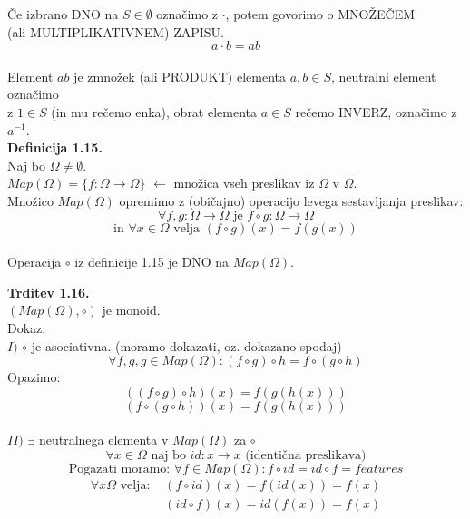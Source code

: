 \documentclass[12pt]{article}
\begin{document}
\noindent
Če izbrano DNO na $S \in \emptyset$ označimo z $\cdot$, potem govorimo o MNOŽEČEM \\
(ali MULTIPLIKATIVNEM) ZAPISU.
$$a \cdot b = ab$$ \\[1em]

\noindent
Element $ab$ je zmnožek (ali PRODUKT) elementa $a, b \in S$, neutralni element označimo \\
z $1 \in S$ (in mu rečemo enka), obrat elementa $a \in S$ rečemo INVERZ, označimo z $a^{-1}$. \\



\noindent
\textbf{Definicija 1.15.} \\
Naj bo $\Omega \ne \emptyset$. \\
$Map(\Omega) = \{ f : \Omega \to \Omega \}$ $\leftarrow$ množica vseh preslikav iz $\Omega$ v $\Omega$. \\
Množico $Map(\Omega)$ opremimo z (običajno) operacijo levega sestavljanja preslikav:
$$
\forall f, g : \Omega \to \Omega \text{ je } f \circ g : \Omega \to \Omega
$$ 
$$
\text{in } \forall x \in \Omega \text{ velja } (f\circ g)(x) = f(g(x))
$$\\[2em]

\noindent
Operacija $\circ$ iz definicije 1.15 je DNO na $Map(\Omega)$.



\vspace*{24pt}


\noindent
\textbf{Trditev 1.16.} \\
$(Map(\Omega), \circ)$ je monoid. \\[1em]
Dokaz: \\[1em]
$I)$ $\circ$ je asociativna. (moramo dokazati, oz. dokazano spodaj)
$$
\forall f, g, g \in Map(\Omega) : (f \circ g) \circ h = f \circ (g \circ h)
$$
Opazimo:
$$
((f \circ g) \circ h)(x) = f(g(h(x)))
$$
$$
(f\circ (g \circ h))(x) = f(g(h(x)))
$$
\\[1em]

\noindent
$II)$ $\exists$ neutralnega elementa v $Map(\Omega)$ za $\circ$
$$
\forall x \in \Omega \text{ naj bo } id : x \to x \text{ (identična preslikava)}
$$
$$
\text{Pogazati moramo: } \forall f \in Map(\Omega): f \circ id = id \circ f = features
$$
\begin{align*}
    \forall x \Omega \text{ velja: } & (f \circ id)(x) = f(id(x)) = f(x) \\
    & (id \circ f)(x) = id(f(x)) = f(x)
\end{align*}
\end{document}
